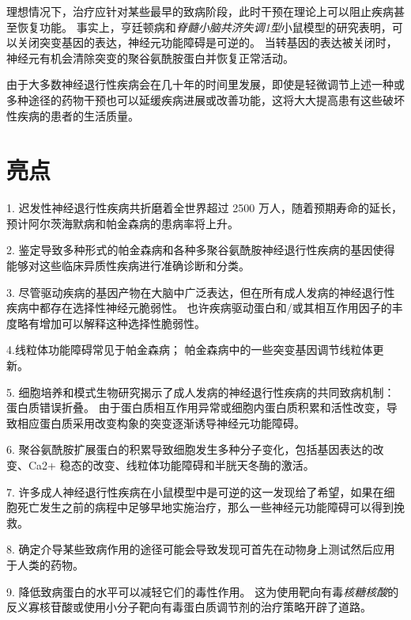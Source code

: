 理想情况下，治疗应针对某些最早的致病阶段，此时干预在理论上可以阻止疾病甚至恢复功能。
事实上，亨廷顿病和\textit{脊髓小脑共济失调1型}小鼠模型的研究表明，可以关闭突变基因的表达，神经元功能障碍是可逆的。
当转基因的表达被关闭时，神经元有机会清除突变的聚谷氨酰胺蛋白并恢复正常活动。


由于大多数神经退行性疾病会在几十年的时间里发展，即使是轻微调节上述一种或多种途径的药物干预也可以延缓疾病进展或改善功能，这将大大提高患有这些破坏性疾病的患者的生活质量。



\section{亮点}

1. 迟发性神经退行性疾病共折磨着全世界超过 2500 万人，随着预期寿命的延长，预计阿尔茨海默病和帕金森病的患病率将上升。 


2. 鉴定导致多种形式的帕金森病和各种多聚谷氨酰胺神经退行性疾病的基因使得能够对这些临床异质性疾病进行准确诊断和分类。


3. 尽管驱动疾病的基因产物在大脑中广泛表达，但在所有成人发病的神经退行性疾病中都存在选择性神经元脆弱性。
也许疾病驱动蛋白和/或其相互作用因子的丰度略有增加可以解释这种选择性脆弱性。


4.线粒体功能障碍常见于帕金森病；
帕金森病中的一些突变基因调节线粒体更新。


5. 细胞培养和模式生物研究揭示了成人发病的神经退行性疾病的共同致病机制：蛋白质错误折叠。
由于蛋白质相互作用异常或细胞内蛋白质积累和活性改变，导致相应蛋白质采用改变构象的突变逐渐诱导神经元功能障碍。


6. 聚谷氨酰胺扩展蛋白的积累导致细胞发生多种分子变化，包括基因表达的改变、Ca2+ 稳态的改变、线粒体功能障碍和半胱天冬酶的激活。


7. 许多成人神经退行性疾病在小鼠模型中是可逆的这一发现给了希望，如果在细胞死亡发生之前的病程中足够早地实施治疗，那么一些神经元功能障碍可以得到挽救。


8. 确定介导某些致病作用的途径可能会导致发现可首先在动物身上测试然后应用于人类的药物。


9. 降低致病蛋白的水平可以减轻它们的毒性作用。
这为使用靶向有毒\textit{核糖核酸}的反义寡核苷酸或使用小分子靶向有毒蛋白质调节剂的治疗策略开辟了道路。

